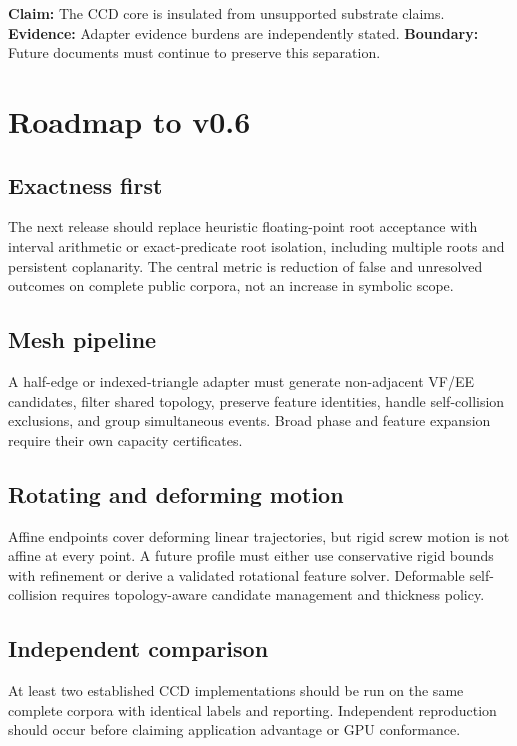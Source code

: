 \documentclass[11pt,a4paper,oneside]{book}
\newcommand{\claim}[1]{\textbf{Claim:} #1}
\newcommand{\evidence}[1]{\textbf{Evidence:} #1}
\newcommand{\boundary}[1]{\textbf{Boundary:} #1}
\begin{document}
\claim{The CCD core is insulated from unsupported substrate claims.} \evidence{Adapter evidence burdens are independently stated.} \boundary{Future documents must continue to preserve this separation.}

\chapter{Roadmap to v0.6}
\section{Exactness first}

The next release should replace heuristic floating-point root acceptance with interval arithmetic or exact-predicate root isolation, including multiple roots and persistent coplanarity. The central metric is reduction of false and unresolved outcomes on complete public corpora, not an increase in symbolic scope.

\section{Mesh pipeline}

A half-edge or indexed-triangle adapter must generate non-adjacent VF/EE candidates, filter shared topology, preserve feature identities, handle self-collision exclusions, and group simultaneous events. Broad phase and feature expansion require their own capacity certificates.

\section{Rotating and deforming motion}

Affine endpoints cover deforming linear trajectories, but rigid screw motion is not affine at every point. A future profile must either use conservative rigid bounds with refinement or derive a validated rotational feature solver. Deformable self-collision requires topology-aware candidate management and thickness policy.

\section{Independent comparison}

At least two established CCD implementations should be run on the same complete corpora with identical labels and reporting. Independent reproduction should occur before claiming application advantage or GPU conformance.
\end{document}
